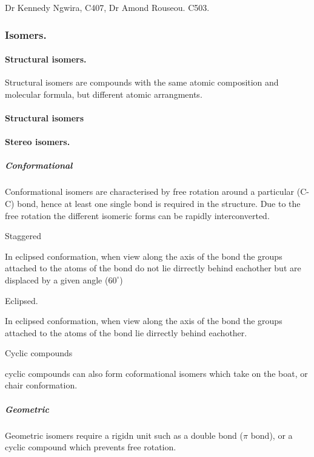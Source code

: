 \documentclass[]{article}
\let\oldparagraph\paragraph
\renewcommand{\paragraph}[1]{\oldparagraph{#1}\mbox{}}
\let\oldsubparagraph\subparagraph
\renewcommand{\subparagraph}[1]{\oldsubparagraph{#1}\mbox{}}
\begin{document}
Dr Kennedy Ngwira, C407, Dr Amond Rouseou. C503.

\subsubsection{Isomers.}\label{isomers.}

\paragraph{Structural isomers.}\label{structural-isomers.}

Structural isomers are compounds with the same atomic composition and
molecular formula, but different atomic arrangments.

\paragraph{Structural isomers}\label{structural-isomers}

\paragraph{Stereo isomers.}\label{stereo-isomers.}

\subparagraph{Conformational}\label{conformational}

Conformational isomers are characterised by free rotation around a
particular (C-C) bond, hence at least one single bond is required in the
structure. Due to the free rotation the different isomeric forms can be
rapidly interconverted.

Staggered

In eclipsed conformation, when view along the axis of the bond the
groups attached to the atoms of the bond do not lie dirrectly behind
eachother but are displaced by a given angle (\(60^\circ\))

Eclipsed.

In eclipsed conformation, when view along the axis of the bond the
groups attached to the atoms of the bond lie dirrectly behind eachother.

Cyclic compounds

cyclic compounds can also form coformational isomers which take on the
boat, or chair conformation.

\subparagraph{Geometric}\label{geometric}

Geometric isomers require a rigidn unit such as a double bond (\(\pi\)
bond), or a cyclic compound which prevents free rotation.
\end{document}
